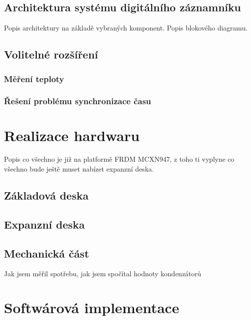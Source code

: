 
\section{Architektura systému digitálního záznamníku}
Popis architektury na základě vybraných komponent. Popis blokového diagramu.


\section{Volitelné rozšíření}
\subsection{Měření teploty}


\subsection{Řešení problému synchronizace času}


\chapter{Realizace hardwaru}
Popis co všechno je již na platformě FRDM MCXN947, z toho ti vyplyne co všechno bude ještě muset nabízet expanzní deska.
\section{Základová deska}
\section{Expanzní deska}

\section{Mechanická část}
Jak jsem měřil spotřebu, jak jsem spočítal hodnoty kondenzátorů

\chapter{Softwárová implementace}

